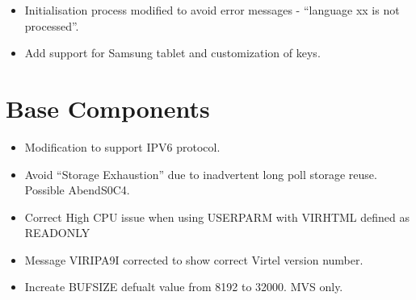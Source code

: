 \documentclass[letterpaper,10pt,english]{sphinxmanual}
\begin{document}
\begin{itemize}
\item {} 
Initialisation process modified to avoid error messages - “language xx is not processed”.

\end{itemize}

\begin{itemize}
\item {} 
Add support for Samsung tablet and customization of keys.

\end{itemize}

\newpage


\section{Base Components}
\label{\detokenize{TN202101:base-components}}
\begin{itemize}
\item {} 
Modification to support IPV6 protocol.

\end{itemize}

\begin{itemize}
\item {} 
Avoid “Storage Exhaustion” due to inadvertent long poll storage reuse. Possible AbendS0C4.

\end{itemize}

\begin{itemize}
\item {} 
Correct High CPU issue when using USERPARM with VIRHTML defined as READONLY

\end{itemize}

\begin{itemize}
\item {} 
Message VIRIPA9I corrected to show correct Virtel version number.

\end{itemize}

\begin{itemize}
\item {} 
Increate BUFSIZE defualt value from 8192 to 32000. MVS only.

\end{itemize}
\end{document}
